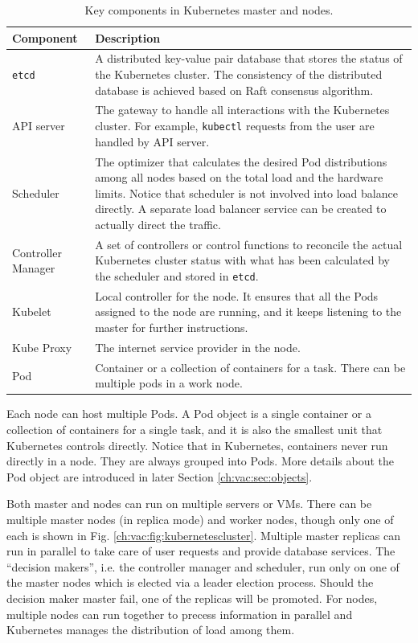 \begin{table}[!htb]
	\centering
	\caption{Key components in Kubernetes master and nodes.} \label{ch:vac:tab:keycomponents}
	\begin{tabularx}{\textwidth}{lX}
		\hline
		Component  & Description \\
		\hline
		\verb|etcd| & A distributed key-value pair database that stores the status of the Kubernetes cluster. The consistency of the distributed database is achieved based on Raft consensus algorithm. \\ \hline
		API server & The gateway to handle all interactions with the Kubernetes cluster. For example, \verb|kubectl| requests from the user are handled by API server. \\ \hline
		Scheduler & The optimizer that calculates the desired Pod distributions among all nodes based on the total load and the hardware limits. Notice that scheduler is not involved into load balance directly. A separate load balancer service can be created to actually direct the traffic. \\ \hline
		Controller Manager & A set of controllers or control functions to reconcile the actual Kubernetes cluster status with what has been calculated by the scheduler and stored in \verb|etcd|. \\ \hline
		Kubelet & Local controller for the node. It ensures that all the Pods assigned to the node are running, and it keeps listening to the master for further instructions. \\ \hline
		Kube Proxy & The internet service provider in the node. \\ \hline
		Pod & Container or a collection of containers for a task. There can be multiple pods in a work node. \\
		\hline
	\end{tabularx}
\end{table}

Each node can host multiple Pods. A Pod object is a single container or a collection of containers for a single task, and it is also the smallest unit that Kubernetes controls directly. Notice that in Kubernetes, containers never run directly in a node. They are always grouped into Pods. More details about the Pod object are introduced in later Section \ref{ch:vac:sec:objects}.

Both master and nodes can run on multiple servers or VMs. There can be multiple master nodes (in replica mode) and worker nodes, though only one of each is shown in Fig. \ref{ch:vac:fig:kubernetescluster}. Multiple master replicas can run in parallel to take care of user requests and provide database services. The ``decision makers'', i.e. the controller manager and scheduler, run only on one of the master nodes which is elected via a leader election process. Should the decision maker master fail, one of the replicas will be promoted. For nodes, multiple nodes can run together to precess information in parallel and Kubernetes manages the distribution of load among them.

